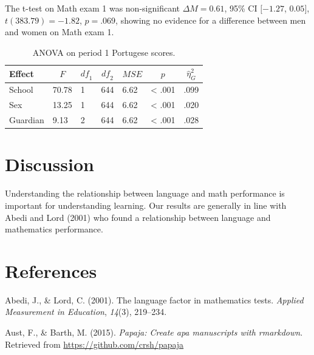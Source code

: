 \documentclass[english,floatsintext,man]{apa6}
\theoremstyle{definition}
\theoremstyle{definition}
\theoremstyle{definition}
\theoremstyle{remark}
\begin{document}
The t-test on Math exam 1 was non-significant \(\Delta M = 0.61\), 95\%
CI \([-1.27\), \(0.05]\), \(t(383.79) = -1.82\), \(p = .069\), showing
no evidence for a difference between men and women on Math exam 1.

\begin{table}[tbp]
\begin{center}
\begin{threeparttable}
\caption{\label{tab:unnamed-chunk-1}ANOVA on period 1 Portugese scores.}
\begin{tabular}{lllllll}
\toprule
Effect & \multicolumn{1}{c}{$F$} & \multicolumn{1}{c}{$\mathit{df}_1$} & \multicolumn{1}{c}{$\mathit{df}_2$} & \multicolumn{1}{c}{$\mathit{MSE}$} & \multicolumn{1}{c}{$p$} & \multicolumn{1}{c}{$\hat{\eta}^2_G$}\\
\midrule
School & 70.78 & 1 & 644 & 6.62 & < .001 & .099\\
Sex & 13.25 & 1 & 644 & 6.62 & < .001 & .020\\
Guardian & 9.13 & 2 & 644 & 6.62 & < .001 & .028\\
\bottomrule
\end{tabular}
\end{threeparttable}
\end{center}
\end{table}

\section{Discussion}\label{discussion}

Understanding the relationship between language and math performance is
important for understanding learning. Our results are generally in line
with Abedi and Lord (2001) who found a relationship between language and
mathematics performance.

\section{References}\label{references}

\setlength{\parindent}{-0.5in} \setlength{\leftskip}{0.5in}
\setlength{\parskip}{8pt}

\hypertarget{refs}{}
\hypertarget{ref-abedi2001language}{}
Abedi, J., \& Lord, C. (2001). The language factor in mathematics tests.
\emph{Applied Measurement in Education}, \emph{14}(3), 219--234.

\hypertarget{ref-aust2015papaja}{}
Aust, F., \& Barth, M. (2015). \emph{Papaja: Create apa manuscripts with
rmarkdown}. Retrieved from \url{https://github.com/crsh/papaja}
\end{document}
